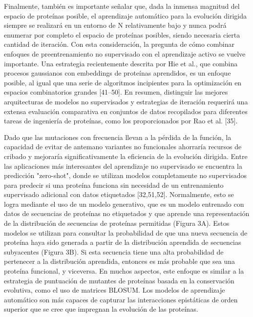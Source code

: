 \documentclass[12pt]{article}
\begin{document}
Finalmente, también es importante señalar que, dada la inmensa magnitud del espacio de proteínas posible, el aprendizaje automático para la evolución dirigida siempre se realizará en un entorno de N relativamente bajo y nunca podrá enumerar por completo el espacio de proteínas posibles, siendo necesaria cierta cantidad de iteración. Con esta consideración, la pregunta de cómo combinar enfoques de preentrenamiento no supervisado con el aprendizaje activo se vuelve importante. Una estrategia recientemente descrita por Hie et al., que combina procesos gaussianos con embeddings de proteínas aprendidos, es un enfoque posible, al igual que una serie de algoritmos incipientes para la optimización en espacios combinatorios grandes [41–50]. En resumen, distinguir las mejores arquitecturas de modelos no supervisados y estrategias de iteración requerirá una extensa evaluación comparativa en conjuntos de datos recopilados para diferentes tareas de ingeniería de proteínas, como los proporcionados por Rao et al. [35].


Dado que las mutaciones con frecuencia llevan a la pérdida de la función, la capacidad de evitar de antemano variantes no funcionales ahorraría recursos de cribado y mejoraría significativamente la eficiencia de la evolución dirigida. Entre las aplicaciones más interesantes del aprendizaje no supervisado se encuentra la predicción "zero-shot", donde se utilizan modelos completamente no supervisados para predecir si una proteína funciona sin necesidad de un entrenamiento supervisado adicional con datos etiquetados [32,51,52]. Normalmente, esto se logra mediante el uso de un modelo generativo, que es un modelo entrenado con datos de secuencias de proteínas no etiquetados y que aprende una representación de la distribución de secuencias de proteínas permitidas (Figura 3A). Estos modelos se utilizan para consultar la probabilidad de que una nueva secuencia de proteína haya sido generada a partir de la distribución aprendida de secuencias subyacentes (Figura 3B). Si esta secuencia tiene una alta probabilidad de pertenecer a la distribución aprendida, entonces es más probable que sea una proteína funcional, y viceversa. En muchos aspectos, este enfoque es similar a la estrategia de puntuación de mutantes de proteínas basada en la conservación evolutiva, como el uso de matrices BLOSUM. Los modelos de aprendizaje automático son más capaces de capturar las interacciones epistáticas de orden superior que se cree que impregnan la evolución de las proteínas.
\end{document}
